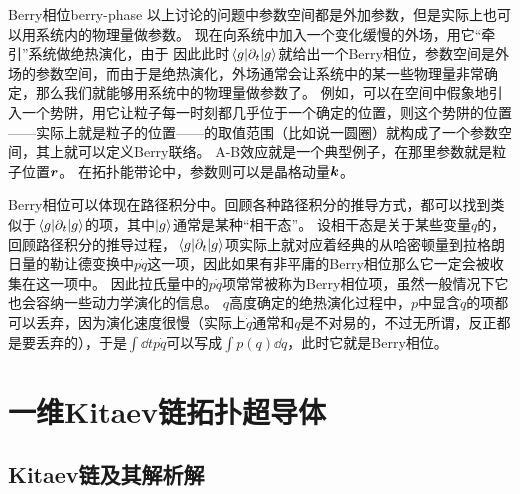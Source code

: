 \begin{back}{Berry相位}{berry-phase}
    以上讨论的问题中参数空间都是外加参数，但是实际上也可以用系统内的物理量做参数。
    现在向系统中加入一个变化缓慢的外场，用它“牵引”系统做绝热演化，由于
    因此此时$\mel{g}{\partial_t}{g}$就给出一个Berry相位，参数空间是外场的参数空间，而由于是绝热演化，外场通常会让系统中的某一些物理量非常确定，那么我们就能够用系统中的物理量做参数了。
    例如，可以在空间中假象地引入一个势阱，用它让粒子每一时刻都几乎位于一个确定的位置，则这个势阱的位置——实际上就是粒子的位置——的取值范围（比如说一圆圈）就构成了一个参数空间，其上就可以定义Berry联络。
    A-B效应就是一个典型例子，在那里参数就是粒子位置$\vb*{r}$。
    在拓扑能带论中，参数则可以是晶格动量$\vb*{k}$。

    Berry相位可以体现在路径积分中。回顾各种路径积分的推导方式，都可以找到类似于$\mel{g}{\partial_t}{g}$的项，其中$\ket{g}$通常是某种“相干态”。
    设相干态是关于某些变量$q$的，回顾路径积分的推导过程，$\mel{g}{\partial_t}{g}$项实际上就对应着经典的从哈密顿量到拉格朗日量的勒让德变换中$p \dot{q}$这一项，因此如果有非平庸的Berry相位那么它一定会被收集在这一项中。
    因此拉氏量中的$p \dot{q}$项常常被称为Berry相位项，虽然一般情况下它也会容纳一些动力学演化的信息。
    $q$高度确定的绝热演化过程中，$p$中显含$\dot{q}$的项都可以丢弃，因为演化速度很慢（实际上$\dot{q}$通常和$q$是不对易的，不过无所谓，反正都是要丢弃的），于是$\int \dd{t} p \dot{q}$可以写成$\int p(q) \dd{q}$，此时它就是Berry相位。
\end{back}

\section{一维Kitaev链拓扑超导体}

\subsection{Kitaev链及其解析解}

